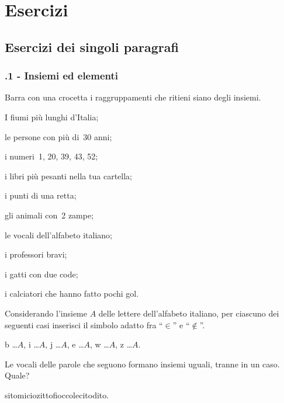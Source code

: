\section{Esercizi}
\subsection{Esercizi dei singoli paragrafi}
\subsubsection*{\thechapter.1 - Insiemi ed elementi}

\begin{esercizio}
 \label{ese:5.1}
 Barra con una crocetta i raggruppamenti che ritieni siano degli insiemi.
 \begin{multicols}{2}
 \begin{enumeratea}
\item I fiumi più lunghi d'Italia;
\item le persone con più di~30 anni;
\item i numeri~1, 20, 39, 43, 52;
\item i libri più pesanti nella tua cartella;
\item i punti di una retta;
\item gli animali con~2 zampe;
\item le vocali dell'alfabeto italiano;
\item i professori bravi;
\item i gatti con due code;
\item i calciatori che hanno fatto pochi gol.
\end{enumeratea}
\end{multicols}
\end{esercizio}

\begin{esercizio}
 \label{ese:5.2}
Considerando l'insieme $A$ delle lettere dell'alfabeto italiano, per ciascuno dei seguenti casi inserisci il simbolo adatto fra ``$\in$'' e ``$\notin$''.

b \ldots $A$, i \ldots $A$, j \ldots $A$, e \ldots $A$, w \ldots $A$, z \ldots $A$.
\end{esercizio}

\begin{esercizio}
\label{ese:5.3}
Le vocali delle parole che seguono formano insiemi uguali, tranne in un caso. Quale?
\begin{center}
 \boxA\quad sito\quad\boxB\quad micio\quad\boxC\quad zitto\quad\boxD\quad fiocco\quad\boxE\quad lecito\quad\boxF\quad dito.
\end{center}
\end{esercizio}

